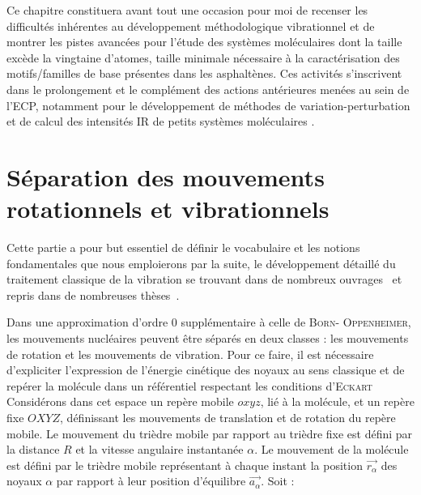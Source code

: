 Ce chapitre constituera avant tout une occasion pour moi de recenser les difficultés inhérentes au développement méthodologique vibrationnel et de montrer les pistes avancées pour l'étude des systèmes moléculaires dont la taille excède la vingtaine d'atomes, taille minimale nécessaire à la caractérisation des motifs/familles de base présentes dans les asphaltènes. Ces activités s’inscrivent dans le prolongement et le complément des actions antérieures menées au sein de l'ECP, notamment pour le développement de méthodes de variation-perturbation et de calcul des intensités IR de petits systèmes moléculaires \cite{krusic1991electron}. 



\section[Séparation des mouvements]{Séparation des mouvements rotationnels et vibrationnels}

Cette partie a pour but essentiel de définir le vocabulaire et les notions fondamentales que nous emploierons par la suite, le développement détaillé du traitement classique de la vibration se trouvant dans de nombreux ouvrages~\cite{barchewitz1971spectroscopie,wilson1955molecular,wilson1955molecular} et repris dans de nombreuses thèses~\cite{pouchan1978approche,zaki1996etude}.

Dans une approximation d'ordre 0 supplémentaire à celle de \textsc{Born}- \textsc{Oppenheimer}, les mouvements nucléaires peuvent être séparés en deux classes : les mouvements de rotation et les mouvements de vibration.
Pour ce faire, il est nécessaire d'expliciter l'expression de l'énergie cinétique des noyaux au sens classique et de repérer la molécule dans un référentiel respectant les conditions d'\textsc{Eckart}~\cite{eckart1935some}
Considérons dans cet espace un repère mobile $oxyz$, lié à la molécule, et un repère fixe $OXYZ$, définissant les mouvements de translation et de rotation du repère mobile. Le mouvement du trièdre mobile par rapport au trièdre fixe est défini par la distance $R$ et la vitesse angulaire instantanée $\alpha$.
Le mouvement de la molécule est défini par le trièdre mobile représentant à chaque instant la position $\stackrel{\rightarrow}{r_{\alpha}}$ des noyaux $\alpha$ par rapport à leur position d'équilibre $\stackrel{\rightarrow}{a_{\alpha}}$. Soit : 

